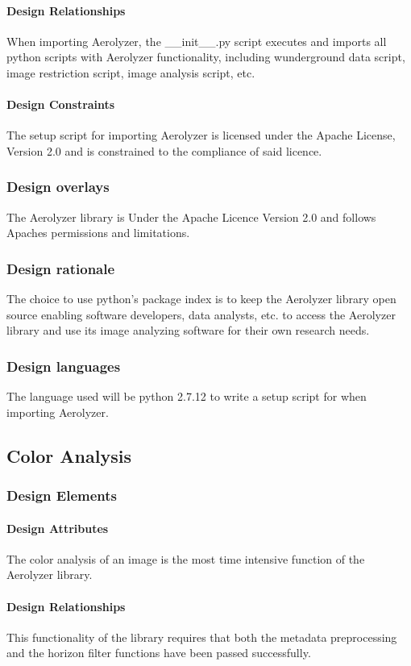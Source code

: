 \documentclass[onecolumn, draftclsnofoot,10pt, compsoc]{IEEEtran}
\begin{document}
\begin{singlespace}
          \paragraph{Design Relationships}
          When importing Aerolyzer, the \_\_init\_\_.py script executes and imports all python scripts with Aerolyzer functionality, including wunderground data script, image restriction script, image analysis script, etc.
          \paragraph{Design Constraints}
          The setup script for importing Aerolyzer is licensed under the Apache License, Version 2.0 and is constrained to the compliance of said licence. 
      \subsubsection{Design overlays}
      		The Aerolyzer library is Under the Apache Licence Version 2.0 and follows Apaches permissions and limitations.
      \subsubsection{Design rationale}
      		The choice to use python’s package index is to keep the Aerolyzer library open source enabling software developers, data analysts, etc. to access the Aerolyzer library and use its image analyzing software for their own research needs. 
      \subsubsection{Design languages}
      The language used will be python 2.7.12 to write a setup script for when importing Aerolyzer.
	\subsection{Color Analysis}\label{des:coloranalysis}
      \subsubsection{Design Elements}
          \paragraph{Design Attributes}
            The color analysis of an image is the most time intensive function of the Aerolyzer library.
          \paragraph{Design Relationships}
			This functionality of the library requires that both the metadata preprocessing and the horizon filter functions have been passed successfully.

\end{singlespace}
\end{document}
